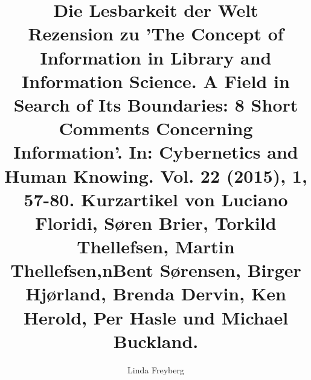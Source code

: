 
\fancyhead[R]{\thepage} %

\title{\LARGE{Die Lesbarkeit der Welt} \\ Rezension zu 'The Concept of Information in Library and Information Science. A Field in Search of Its Boundaries: 8 Short Comments Concerning Information'. In: Cybernetics and Human Knowing. Vol. 22 (2015), 1, 57-80. Kurzartikel von Luciano Floridi, Søren Brier, Torkild Thellefsen, Martin Thellefsen,nBent Sørensen, Birger Hjørland, Brenda Dervin, Ken Herold, Per Hasle und Michael Buckland.} %
\author{Linda Freyberg} %

\setcounter{page}{1}
